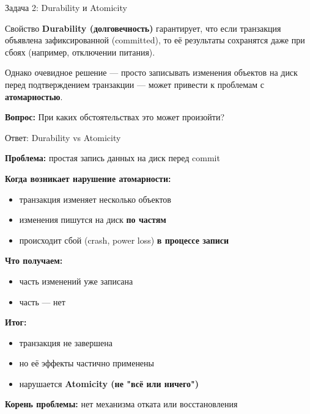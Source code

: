 \documentclass{beamer}
\begin{document}
\begin{frame}{Задача 2: Durability и Atomicity}

Свойство \textbf{Durability (долговечность)} гарантирует, что если транзакция
объявлена зафиксированной (committed), то её результаты сохранятся даже при сбоях
(например, отключении питания).

\vspace{0.7em}

Однако очевидное решение — просто записывать изменения объектов на диск перед
подтверждением транзакции — может привести к проблемам с \textbf{атомарностью}.

\vspace{0.7em}

\textbf{Вопрос:}  
При каких обстоятельствах это может произойти?

\end{frame}

\begin{frame}{Ответ: Durability vs Atomicity}

\textbf{Проблема:} простая запись данных на диск перед commit

\vspace{0.7em}

\textbf{Когда возникает нарушение атомарности:}
\begin{itemize}
    \item транзакция изменяет несколько объектов
    \item изменения пишутся на диск \textbf{по частям}
    \item происходит сбой (crash, power loss) \textbf{в процессе записи}
\end{itemize}

\vspace{0.7em}

\textbf{Что получаем:}
\begin{itemize}
    \item часть изменений уже записана
    \item часть — нет
\end{itemize}

\vspace{0.5em}

\textbf{Итог:}
\begin{itemize}
    \item транзакция не завершена
    \item но её эффекты частично применены
    \item нарушается \textbf{Atomicity (не "всё или ничего")}
\end{itemize}

\vspace{0.7em}

\textbf{Корень проблемы:} нет механизма отката или восстановления

\end{frame}
\end{document}
